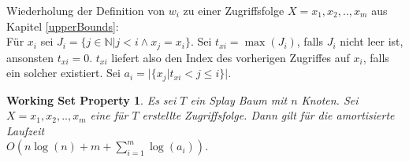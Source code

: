 \documentclass[a4paper,12pt]{article}
\begin{document}
\noindent Wiederholung der Definition von $w_i$ zu einer Zugriffsfolge $X = x_1, x_2,.., x_m$ aus Kapitel \ref{upperBounds}:\\
Für $x_i$ sei $J_i = \{j \in \mathbb{N} \vert j < i \land x_j = x_i \}$.
Sei $t_{xi} = \max \left(J_i\right)$, falls $J_i$ nicht leer ist, ansonsten $t_{xi} = 0$. $t_{xi}$ liefert also den Index des vorherigen Zugriffes auf $x_i$, falls ein solcher existiert. Sei ${a_i = \vert\{x_j \vert t_{xi} < j \leq i   \} \vert }$.

\newtheorem{Satz2}{Working Set Property}[section] \label{workingSetSplay}
\begin{Satz2} Es sei $T$ ein Splay Baum mit $n$ Knoten. Sei $X = x_1,x_2,..,x_m$ eine für $T$ erstellte Zugriffsfolge. Dann gilt für die amortisierte Laufzeit \\
	$O\left( n \log\left(n\right) + m +\sum_{i = 1}^{m} \log\left( a_i\right) \right)$.
\end{Satz2}
\end{document}
